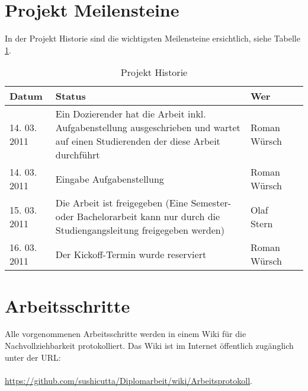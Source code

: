 \documentclass[
11pt, %
a4paper, %
BCOR25mm, %
DIV14, %
footsepline = false, %
headsepline, %
twoside, %
openright,
abstracton, %
listof=totocnumbered, %
bibliography=totocnumbered %
]{scrreprt}
\begin{document}
  \section{Projekt Meilensteine}
  
  In der Projekt Historie sind die wichtigsten Meilensteine ersichtlich, siehe
  Tabelle \ref{tab:projekthistorie}.
  \newline
  
  \begin{table}[h]
    \begin{center}
      \begin{tabular}{lp{9cm}ll}
        \toprule
        Datum & Status & Wer \\
        \midrule
        14. 03. 2011 & Ein Dozierender hat die Arbeit inkl. Aufgabenstellung
        ausgeschrieben und wartet auf einen Studierenden der  diese Arbeit
        durchführt & Roman Würsch\\
        14. 03. 2011 & Eingabe Aufgabenstellung & Roman Würsch\\
        15. 03. 2011 & Die Arbeit ist freigegeben (Eine Semester- oder
        Bachelorarbeit kann nur durch die Studiengangsleitung freigegeben
        werden) & Olaf Stern\\
        16. 03. 2011 & Der Kickoff-Termin wurde reserviert & Roman Würsch\\
        \bottomrule
      \end{tabular}
      \caption{Projekt Historie}
      \label{tab:projekthistorie}
    \end{center}
  \end{table}
  
  \section{Arbeitsschritte}
  
  Alle vorgenommenen Arbeitsschritte werden in einem Wiki für die
  Nachvollziehbarkeit protokolliert. Das Wiki ist im Internet öffentlich
  zugänglich unter der \ac{URL}:\\
  \\
  \url{https://github.com/sushicutta/Diplomarbeit/wiki/Arbeitsprotokoll}. 
  
  \newpage
  
  
\end{document}
